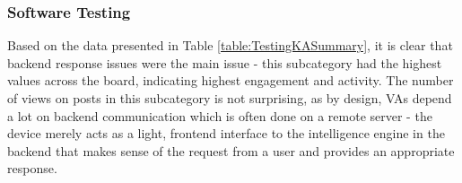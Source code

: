 \documentclass{sigchi}
\begin{document}
\subsubsection{Software Testing}
Based on the data presented in Table \ref{table:TestingKASummary}, it is clear that backend response issues were the main issue - this subcategory had the highest values across the board, indicating highest engagement and activity. The number of views on posts in this subcategory is not surprising, as by design, VAs depend a lot on backend communication which is often done on a remote server - the device merely acts as a light, frontend interface to the intelligence engine in the backend that makes sense of the request from a user and provides an appropriate response. 
\begin{table}[H] %
\centering
\end{table}
\end{document}

